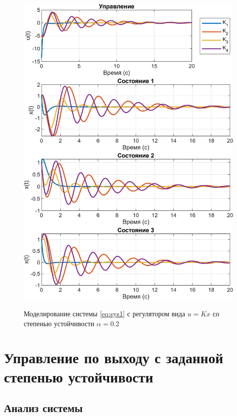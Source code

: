 \begin{figure}[H]
    \centering
    \caption{Моделирование системы \eqref{eq:sys1} с регулятором вида $u=Kx$
    со степенью устойчивости $\alpha=0.2$}
    \includegraphics[width=\linewidth]{figs/task11.png}
    \label{fig:2k1}
\end{figure}





\section{Управление по выходу с заданной степенью устойчивости}

\subsection{Анализ системы}

